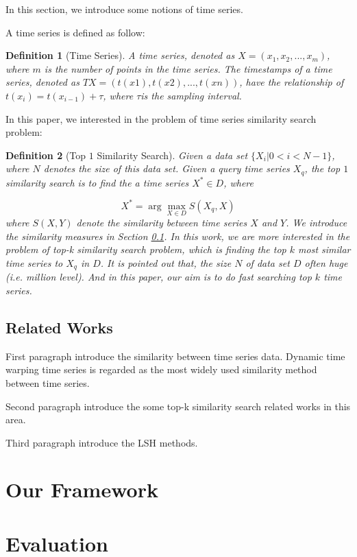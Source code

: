 \documentclass{article}
\newtheorem{definition}{Definition}
\begin{document}
In this section, we introduce some notions of time series. 

A time series is defined as follow:
\begin{definition}[Time Series]
A time series, denoted as $X = (x_1,x_2,...,x_m)$, where $m$ is the number of points in the time series. The timestamps of a time series, denoted as $TX = (t(x1), t(x2),..., t(xn))$, have the relationship of $t(x_i) = t(x_{i-1})+\tau$, where $\tau$is the sampling interval.
\end{definition}

In this paper, we interested in the problem of time series similarity search problem:
\begin{definition}[Top $1$ Similarity Search]
Given a data set $\{X_i|0<i<N-1\}$, where $N$ denotes the size of this data set. Given a query time series $X_q$, the top $1$ similarity search is to find the a time series $X^* \in D$, where

\[
X^* = \arg \max_{X \in D} S(X_q,X)
\]
where $S(X,Y)$ denote the similarity between time series $X$ and $Y$. We introduce the similarity measures in Section \ref{relatedwork}. In this work, we are more interested in the problem of top-k similarity search problem, which is finding the top $k$ most similar time series to $X_q$ in $D$. It is pointed out that, the size $N$ of data set $D$ often huge (i.e. million level). And in this paper, our aim is to do fast searching top $k$ time series.

\end{definition}

\subsection{Related Works}
\label{relatedwork}

First paragraph introduce the similarity between time series data.
Dynamic time warping \cite{rakthanmanon2012searching} time series is regarded as the most widely used similarity method between time series. 

Second paragraph introduce the some top-k similarity search related works in this area.

Third paragraph introduce the LSH methods.


\section{Our Framework}


\section{Evaluation}
\end{document}
